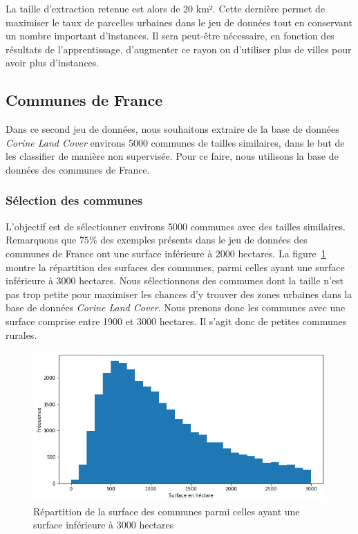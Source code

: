 La taille d'extraction retenue est alors de 20 km².
Cette dernière permet de maximiser le taux de parcelles urbaines dans le jeu de données tout en conservant un nombre important d'instances.
Il sera peut-être nécessaire, en fonction des résultats de l'apprentissage, d'augmenter ce rayon ou d'utiliser plus de villes pour avoir plus d'instances.

\subsection{Communes de France}

Dans ce second jeu de données, nous souhaitons extraire de la base de données \emph{Corine Land Cover} environs 5000 communes de tailles similaires, dans le but de les classifier de manière non supervisée.
Pour ce faire, nous utilisons la base de données des communes de France.

\subsubsection{Sélection des communes}

L'objectif est de sélectionner environs 5000 communes avec des tailles similaires.
Remarquons que $75\%$ des exemples présents dans le jeu de données des communes de France ont une surface inférieure à $2000$ hectares.
La figure~\ref{fig:surf-communes} montre la répartition des surfaces des communes, parmi celles ayant une surface inférieure à $3000$ hectares.
Nous sélectionnons des communes dont la taille n'est pas trop petite pour maximiser les chances d'y trouver des zones urbaines dans la base de données \emph{Corine Land Cover}.
Nous prenons donc les communes avec une surface comprise entre 1900 et 3000 hectares.
Il s'agit donc de petites communes rurales.

\begin{figure}[!h]
    \centering
    \includegraphics[scale=0.5]{figures/surf-communes}
    \caption{Répartition de la surface des communes parmi celles ayant une surface inférieure à 3000 hectares}
    \label{fig:surf-communes}
\end{figure}

